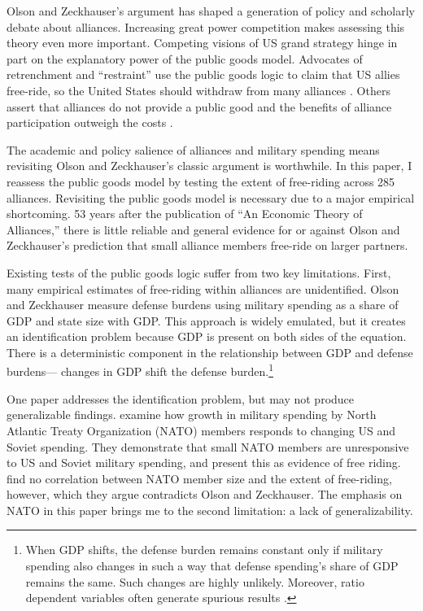 \documentclass[12pt]{article}
\begin{document}
Olson and Zeckhauser's argument has shaped a generation of policy and scholarly debate about alliances. 
Increasing great power competition makes assessing this theory even more important. 
Competing visions of US grand strategy hinge in part on the explanatory power of the public goods model. 
Advocates of retrenchment and ``restraint'' use the public goods logic to claim that US allies free-ride, so the United States should withdraw from many alliances \citep{Preble2009, Posen2014}. 
Others assert that alliances do not provide a public good and the benefits of alliance participation outweigh the costs \citep{Brooksetal2013, BrandsFeaver2017}. 


The academic and policy salience of alliances and military spending means revisiting Olson and Zeckhauser's classic argument is worthwhile. 
In this paper, I reassess the public goods model by testing the extent of free-riding across 285 alliances. 
Revisiting the public goods model is necessary due to a major empirical shortcoming.
53 years after the publication of ``An Economic Theory of Alliances,'' there is little reliable and general evidence for or against Olson and Zeckhauser's prediction that small alliance members free-ride on larger partners. 


Existing tests of the public goods logic suffer from two key limitations.
First, many empirical estimates of free-riding within alliances are unidentified.
Olson and Zeckhauser measure defense burdens using military spending as a share of GDP and state size with GDP.
This approach is widely emulated, but it creates an identification problem because GDP is present on both sides of the equation.
There is a deterministic component in the relationship between GDP and defense burdens--- changes in GDP shift the defense burden.\footnote{
When GDP shifts, the defense burden remains constant only if military spending also changes in such a way that defense spending's share of GDP remains the same. Such changes are highly unlikely. Moreover, ratio dependent variables often generate spurious results \citep{Kronmal1993}.}  
 

One paper addresses the identification problem, but may not produce generalizable findings. 
\citet{PluemperNeumayer2015} examine how growth in military spending by North Atlantic Treaty Organization (NATO) members responds to changing US and Soviet spending.
They demonstrate that small NATO members are unresponsive to US and Soviet military spending, and present this as evidence of free riding.
\citet{PluemperNeumayer2015} find no correlation between NATO member size and the extent of free-riding, however, which they argue contradicts Olson and Zeckhauser.
The emphasis on NATO in this paper brings me to the second limitation: a lack of generalizability. 
\end{document}
